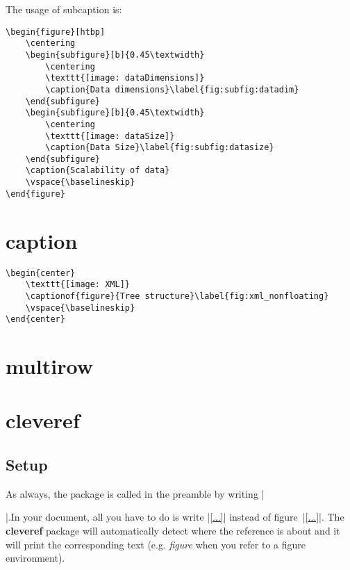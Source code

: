 The usage of subcaption is:
\begin{lstlisting}[language={[LaTeX]TeX}]
\begin{figure}[htbp]
	\centering
	\begin{subfigure}[b]{0.45\textwidth}
		\centering
		\texttt{[image: dataDimensions]}
		\caption{Data dimensions}\label{fig:subfig:datadim}
	\end{subfigure}
	\begin{subfigure}[b]{0.45\textwidth}
		\centering
		\texttt{[image: dataSize]}
		\caption{Data Size}\label{fig:subfig:datasize}
	\end{subfigure}
	\caption{Scalability of data}
	\vspace{\baselineskip}
\end{figure}
\end{lstlisting}

\section{caption}

\begin{lstlisting}[language={[LaTeX]TeX}]
\begin{center}
	\texttt{[image: XML]}
	\captionof{figure}{Tree structure}\label{fig:xml_nonfloating}
	\vspace{\baselineskip}
\end{center}
\end{lstlisting}

\section{multirow}


\section{cleveref}
\subsection{Setup}
As always, the package is called in the preamble by writing \cverb|\usepackage{cleveref}|.In your document, all you have to do is write \cverb|\cref{...}| instead of figure~\cverb|\ref{...}|. The \textbf{cleveref} package will automatically detect where the reference is about and it will print the corresponding text (e.g. \textit{figure} when you refer to a figure environment).

